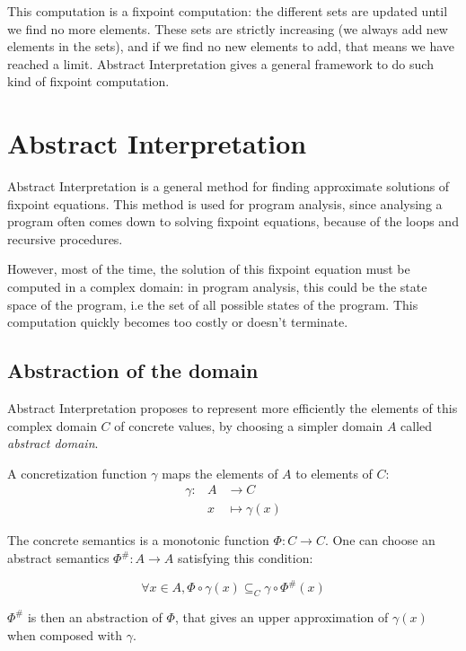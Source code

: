 \documentclass[a4paper,english,titlepage,11pt]{report}
\begin{document}
This computation is a fixpoint computation: the different sets are updated until
we find no more elements. These sets are strictly increasing (we always add new
elements in the sets), and if we find no new elements to add, that means we have
reached a limit. Abstract Interpretation gives a general framework to do such
kind of fixpoint computation.


\section{Abstract Interpretation}

Abstract Interpretation \cite{CC77,CousotCousot92-1} is a general method for
finding approximate solutions of
fixpoint equations. This method is used for program analysis, since analysing a
program often comes down to solving fixpoint equations, because of the loops and
recursive procedures.

However, most of the time, the solution of this fixpoint equation must be
computed in a complex domain: in program analysis, this could be the state space
of the program, i.e the set of all possible states of the program. This
computation quickly becomes too costly or doesn't terminate.

\subsection{Abstraction of the domain}

Abstract Interpretation proposes to represent more efficiently the
elements of this complex domain $C$ of concrete values,
by choosing a simpler domain  $A$ called \emph{abstract domain}. 

A concretization function $\gamma$ maps the elements of $A$ to elements of $C$:
\begin{eqnarray*}
\gamma: & A &\longrightarrow C \\
		& x &\longmapsto \gamma(x)
\end{eqnarray*}

The concrete semantics is a monotonic function $\Phi: C \rightarrow C$.
One can choose an abstract semantics $\Phi^\#: A \rightarrow A$ satisfying this
condition:

$$\forall x \in A, \Phi \circ \gamma (x) \subseteq_C \gamma \circ \Phi^\#(x)$$

$\Phi^\#$ is then an abstraction of $\Phi$, that gives an upper
approximation of $\gamma(x)$ when composed with $\gamma$. 
\end{document}
